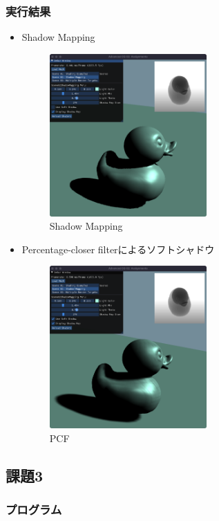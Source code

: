 \documentclass[a4paper,10pt,uplatex,dvipdfmx]{jsarticle}
\begin{document}
\subsubsection*{実行結果}
\begin{itemize}
  \item Shadow Mapping
    \begin{figure}[H]
      \centering
      \includegraphics*[width=6cm]{./img/shadow-mapping.png}
      \caption{Shadow Mapping}
    \end{figure}
  \item Percentage-closer filterによるソフトシャドウ
    \begin{figure}[H]
      \centering
      \includegraphics*[width=6cm]{./img/pcf.png}
      \caption{PCF}
    \end{figure}
\end{itemize}

\subsection*{課題3}
\subsubsection*{プログラム}


\end{document}
